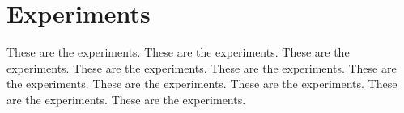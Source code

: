 \section{Experiments}
\label{sec:4}

These are the experiments. These are the experiments. These are the experiments. These are the experiments. These are the experiments. These are the experiments. These are the experiments. These are the experiments. These are the experiments. These are the experiments. 